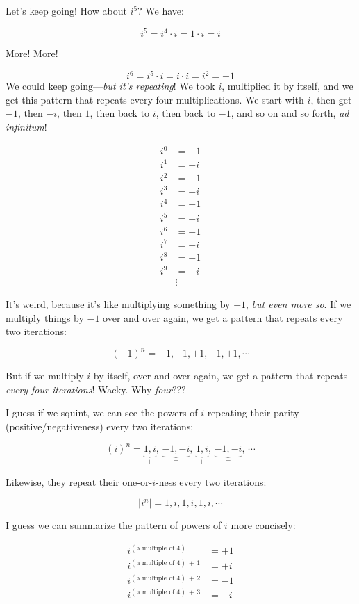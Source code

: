 \documentclass[
]{article}
\begin{document}
Let's keep going! How about \(i^5\)? We have:

\[ i^5 = i^4\cdot i = 1\cdot i = i  \]

More! More!

\[ i^6 = i^5 \cdot i = i\cdot i = i^2 = -1  \] We could keep
going---\emph{but it's repeating}! We took \(i\), multiplied it by
itself, and we get this pattern that repeats every four multiplications.
We start with \(i\), then get \(-1\), then \(-i\), then \(1\), then back
to \(i\), then back to \(-1\), and so on and so forth, \emph{ad
infinitum}!

\[ 
\begin{align*}
i^{0} &= +1 \\
i^{1} &= +i \\
i^{2} &= -1 \\
i^{3} &= -i \\
i^{4} &= +1 \\
i^{5} &= +i \\
i^{6} &= -1 \\
i^{7} &= -i \\
i^{8} &= +1 \\
i^{9} &= +i \\
&\vdots
\end{align*}
\]

It's weird, because it's like multiplying something by \(-1\), \emph{but
even more so}. If we multiply things by \(-1\) over and over again, we
get a pattern that repeats every two iterations:

\[(-1)^n = +1, -1, +1, -1, +1, \cdots \]

But if we multiply \(i\) by itself, over and over again, we get a
pattern that repeats \emph{every four iterations}! Wacky. Why
\emph{four}???

I guess if we squint, we can see the powers of \(i\) repeating their
parity (positive/negativeness) every two iterations:

\[ (i)^n = \underbrace{1, i}_{+},\, \underbrace{-1, -i}_{-},\, \underbrace{1, i}_{+},\, \underbrace{-1, -i}_{-},\,  \cdots\]

Likewise, they repeat their one-or-\(i\)-ness every two iterations:

\[ |i^n| = 1,i, 1, i, 1,i, \cdots\]

I guess we can summarize the pattern of powers of \(i\) more concisely:

\[ 
\begin{align*}
i^{(\text{a multiple of }4)} &= +1 \\
i^{(\text{a multiple of }4) \,+\,1} &= +i \\
i^{(\text{a multiple of }4)\,+\,2} &= -1 \\
i^{(\text{a multiple of }4)\,+\,3} &= -i
\end{align*}
\]
\end{document}
